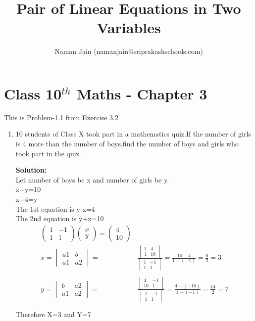 \documentclass[10pt]{article}
\title{Pair of Linear Equations in Two Variables}
\author{Naman Jain  (namanjain@sriprakashschools.com)}
\newcommand{\myvec}[1]{\ensuremath{\begin{pmatrix}#1\end{pmatrix}}}
\newcommand{\mydet}[1]{\ensuremath{\begin{vmatrix}#1\end{vmatrix}}}
\newcommand{\solution}{\noindent \textbf{Solution: }}
\begin{document}
\maketitle
\section*{Class 10$^{th}$ Maths - Chapter 3}
This is Problem-1.1 from Exercise 3.2
\begin{enumerate}
\item 10 students of Class X took part in a mathematics quiz.If the number of girls is 4 more than the number of boys,find the number of boys and girls who took part in the quiz.
	
\solution \\
Let number of boys be x and number of girls be y.\\
x+y=10\\
x+4=y\\


The 1st equation is y-x=4\\
The 2nd equation is y+x=10\\
\begin{align}
\myvec{1&-1\\1&1} \myvec{x\\y}=\myvec{4\\10}\\
x=\mydet{ a1 & b\\a1 & a2} =&
\frac{\mydet{ 1 & 4\\1 & 10}}{\mydet{ 1 & -1\\1 & 1}}
=\frac{10-4}{1-(-1)}
=\frac{6}{2}
=3 \\ \\
y=\mydet{ b & a2\\a1 & a2} =&
\frac{\mydet{ 4 & -1\\10 & 1}}{\mydet{ 1 & -1\\1 & 1}}
=\frac{4-(-10)}{1-(-1)}
=\frac{14}{2}
=7\\ \\
\end{align}
Therefore  X=3 and Y=7
\end{enumerate}
\end{document}
